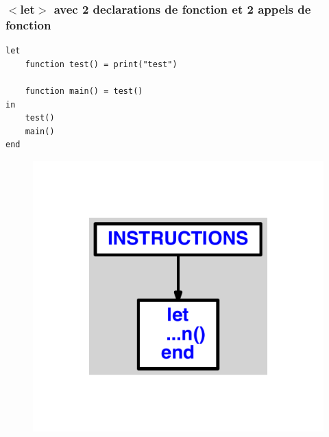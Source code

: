 \documentclass{article}
\begin{document}
\subsubsection{$ < $let$ > $ avec 2 declarations de fonction et 2 appels de fonction}
\begin{lstlisting}
let
	function test() = print("test")

	function main() = test()
in
	test()
	main()
end
\end{lstlisting}
\newpage
\begin{figure}[H]
\centering
\includegraphics[max width=\textwidth]{ast/ast_273.pdf}
\end{figure}
\newpage
\end{document}
